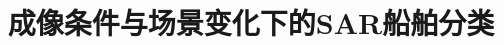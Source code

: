 \documentclass[journal]{IEEEtran}
\title{成像条件与场景变化下的SAR船舶分类}
\author{}
\begin{document}
\raggedbottom
\maketitle


\balance


\end{document}
